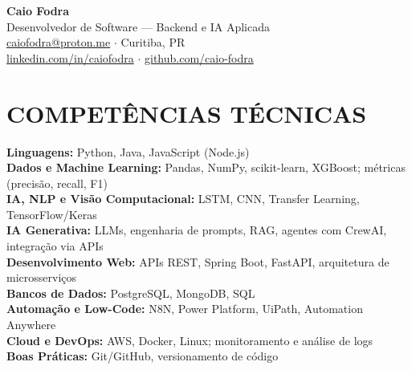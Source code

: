 \documentclass[11pt,a4paper]{article}
\begin{document}
\begin{center}
    {\LARGE\bfseries Caio Fodra} \\[4pt]
    Desenvolvedor de Software --- Backend e IA Aplicada \\[6pt]
    \href{mailto:caiofodra@proton.me}{caiofodra@proton.me} \enspace$\cdot$\enspace
    Curitiba, PR \\[2pt]
    \href{https://linkedin.com/in/caiofodra}{linkedin.com/in/caiofodra} \enspace$\cdot$\enspace
    \href{https://github.com/caio-fodra}{github.com/caio-fodra}
\end{center}

\section{COMPETÊNCIAS TÉCNICAS}
\noindent\textbf{Linguagens:} Python, Java, JavaScript (Node.js) \\
\textbf{Dados e Machine Learning:} Pandas, NumPy, scikit-learn, XGBoost; métricas (precisão, recall, F1) \\
\textbf{IA, NLP e Visão Computacional:} LSTM, CNN, Transfer Learning, TensorFlow/Keras \\
\textbf{IA Generativa:} LLMs, engenharia de prompts, RAG, agentes com CrewAI, integração via APIs \\
\textbf{Desenvolvimento Web:} APIs REST, Spring Boot, FastAPI, arquitetura de microsserviços \\
\textbf{Bancos de Dados:} PostgreSQL, MongoDB, SQL \\
\textbf{Automação e Low-Code:} N8N, Power Platform, UiPath, Automation Anywhere \\
\textbf{Cloud e DevOps:} AWS, Docker, Linux; monitoramento e análise de logs \\
\textbf{Boas Práticas:} Git/GitHub, versionamento de código
\end{document}
